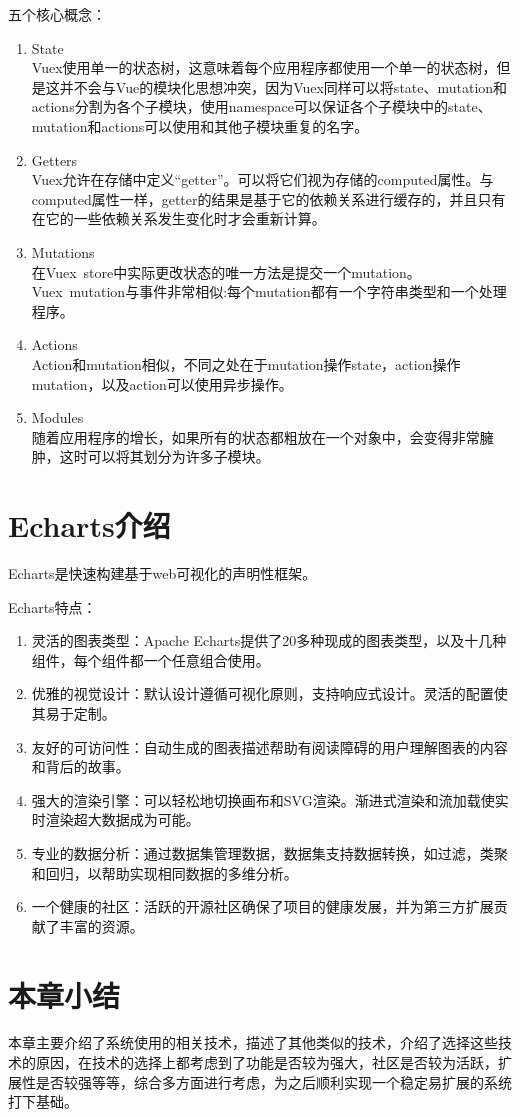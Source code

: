 五个核心概念：

\begin{enumerate}
  \item State\\
        Vuex使用单一的状态树，这意味着每个应用程序都使用一个单一的状态树，但是这并不会与Vue的模块化思想冲突，因为Vuex同样可以将state、mutation和actions分割为各个子模块，使用namespace可以保证各个子模块中的state、mutation和actions可以使用和其他子模块重复的名字。
  \item Getters\\
        Vuex允许在存储中定义“getter”。可以将它们视为存储的computed属性。与computed属性一样，getter的结果是基于它的依赖关系进行缓存的，并且只有在它的一些依赖关系发生变化时才会重新计算。
  \item Mutations\\
        在Vuex~store中实际更改状态的唯一方法是提交一个mutation。Vuex~mutation与事件非常相似:每个mutation都有一个字符串类型和一个处理程序。
  \item Actions\\
        Action和mutation相似，不同之处在于mutation操作state，action操作mutation，以及action可以使用异步操作。
  \item Modules\\
        随着应用程序的增长，如果所有的状态都粗放在一个对象中，会变得非常臃肿，这时可以将其划分为许多子模块。
\end{enumerate}

\section{Echarts介绍}

Echarts是快速构建基于web可视化的声明性框架。

Echarts特点：
\begin{enumerate}
  \item 灵活的图表类型：Apache Echarts提供了20多种现成的图表类型，以及十几种组件，每个组件都一个任意组合使用。
  \item 优雅的视觉设计：默认设计遵循可视化原则，支持响应式设计。灵活的配置使其易于定制。
  \item 友好的可访问性：自动生成的图表描述帮助有阅读障碍的用户理解图表的内容和背后的故事。
  \item 强大的渲染引擎：可以轻松地切换画布和SVG渲染。渐进式渲染和流加载使实时渲染超大数据成为可能。
  \item 专业的数据分析：通过数据集管理数据，数据集支持数据转换，如过滤，类聚和回归，以帮助实现相同数据的多维分析。
  \item 一个健康的社区：活跃的开源社区确保了项目的健康发展，并为第三方扩展贡献了丰富的资源。
\end{enumerate}

\section{本章小结}

本章主要介绍了系统使用的相关技术，描述了其他类似的技术，介绍了选择这些技术的原因，在技术的选择上都考虑到了功能是否较为强大，社区是否较为活跃，扩展性是否较强等等，综合多方面进行考虑，为之后顺利实现一个稳定易扩展的系统打下基础。